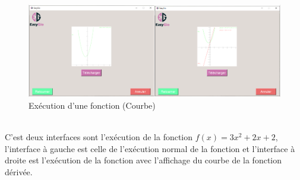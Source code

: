 \documentclass[a4paper]{report}
\begin{document}
\begin{figure}[!h]
    \centering
    \includegraphics[width=15cm]{images/Fonction.PNG}
    \caption{Exécution d'une fonction (Courbe)}
    \label{fig:Exécution d'une fonction (Courbe)}
\end{figure}\\
C'est deux interfaces sont l'exécution de la fonction $f(x)=3x^2+2x+2$, l'interface à gauche est celle de l'exécution normal de la fonction et l'interface à droite est l'exécution de la fonction avec l'affichage du courbe de la fonction dérivée.
\newpage
\end{document}
